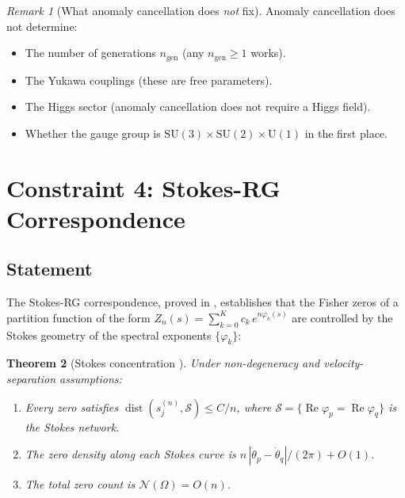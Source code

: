 \documentclass[12pt]{article}
\newtheorem{theorem}{Theorem}[section]
\theoremstyle{definition}
\theoremstyle{remark}
\newtheorem{remark}[theorem]{Remark}
\newcommand{\SU}{\mathrm{SU}}
\newcommand{\UU}{\mathrm{U}}
\newcommand{\re}{\operatorname{Re}}
\newcommand{\dist}{\operatorname{dist}}
\begin{document}
\begin{remark}[What anomaly cancellation does \emph{not} fix]
\label{rem:anomaly_limits}
Anomaly cancellation does not determine:
\begin{itemize}
\item The number of generations $n_{\mathrm{gen}}$ (any $n_{\mathrm{gen}} \geq 1$ works).
\item The Yukawa couplings (these are free parameters).
\item The Higgs sector (anomaly cancellation does not require a Higgs field).
\item Whether the gauge group is $\SU(3) \times \SU(2) \times \UU(1)$
  in the first place.
\end{itemize}
\end{remark}

\section{Constraint 4: Stokes-RG Correspondence}
\label{sec:stokes}

\subsection{Statement}

The Stokes-RG correspondence, proved in \cite{OlbrykPsi2026},
establishes that the Fisher zeros of a partition function of the
form $Z_n(s) = \sum_{k=0}^K c_k\,e^{n\varphi_k(s)}$ are
controlled by the Stokes geometry of the spectral exponents
$\{\varphi_k\}$:

\begin{theorem}[Stokes concentration {\cite[Thm.~1]{OlbrykPsi2026}}]
\label{thm:stokes}
Under non-degeneracy and velocity-separation assumptions:
\begin{enumerate}[label=\textup{(\roman*)}]
\item Every zero satisfies
  $\dist(s_j^{(n)}, \mathcal{S}) \leq C/n$, where
  $\mathcal{S} = \{\re\varphi_p = \re\varphi_q\}$ is the Stokes
  network.
\item The zero density along each Stokes curve is
  $n\,|\dot\theta_p - \dot\theta_q|/(2\pi) + O(1)$.
\item The total zero count is $\mathcal{N}(\Omega) = O(n)$.
\end{enumerate}
\end{theorem}
\end{document}
